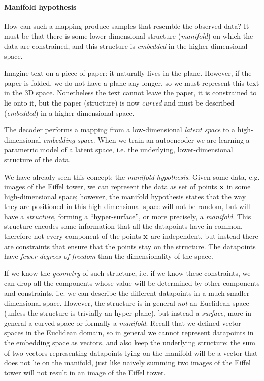 
\paragraph{Manifold hypothesis}

How can such a mapping produce samples that resemble the observed data? It must be that there is some lower-dimensional structure (\emph{manifold}) on which the data are constrained, and this structure is \emph{embedded} in the higher-dimensional space. 

Imagine text on a piece of paper: it naturally lives in the plane. However, if the paper is folded, we do not have a plane any longer, so we must represent this text in the 3D space. Nonetheless the text cannot leave the paper, it is constrained to lie onto it, but the paper (structure) is now \emph{curved} and must be described (\emph{embedded}) in a higher-dimensional space.

The decoder performs a mapping from a low-dimensional \emph{latent space} to a high-dimensional \emph{embedding space}. When we train an autoencoder we are learning a parametric model of a latent space, i.e. the underlying, lower-dimensional structure of the data.

We have already seen this concept: the \emph{manifold hypothesis}. Given some data, e.g. images of the Eiffel tower, we can represent the data as set of points $\vb{x}$ in some high-dimensional space; however, the manifold hypothesis states that the way they are positioned in this high-dimensional space will not be random, but will have a \emph{structure}, forming a ``hyper-surface'', or more precisely, a \emph{manifold}. This structure encodes some information that all the datapoints have in common, therefore not every component of the points $\vb{x}$ are independent, but instead there are constraints that ensure that the points stay on the structure. The datapoints have \emph{fewer degrees of freedom} than the dimensionality of the space.

If we know the \emph{geometry} of such structure, i.e. if we know these constraints, we can drop all the components whose value will be determined by other components and constraints, i.e. we can describe the different datapoints in a much smaller-dimensional space. However, the structure is in general \emph{not} an Euclidean space (unless the structure is trivially an hyper-plane), but instead a \emph{surface}, more in general a curved space or formally a \emph{manifold}. Recall that we defined vector spaces in the Euclidean domain, so in general we cannot represent datapoints in the embedding space as vectors, and also keep the underlying structure: the sum of two vectors representing datapoints lying on the manifold will be a vector that does not lie on the manifold, just like naively summing two images of the Eiffel tower will not result in an image of the Eiffel tower.

